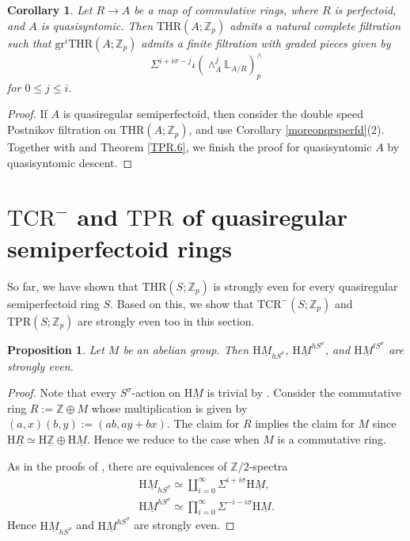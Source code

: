 \documentclass[10pt]{amsart}
\newtheorem{prop}[thm]{Proposition}
\newtheorem{cor}[thm]{Corollary}
\theoremstyle{definition}
\numberwithin{equation}{section}
\renewcommand{\L}{\mathbb{L}}
\newcommand{\Z}{\mathbb{Z}}
\newcommand{\rH}{\mathrm{H}}
\newcommand{\ul}{\underline}
\newcommand{\gr}{\mathrm{gr}}
\newcommand{\TPR}{\mathrm{TPR}}
\newcommand{\THR}{\mathrm{THR}}
\newcommand{\TCR}{\mathrm{TCR}}
\begin{document}
{\begin{cor}
Let $R\to A$ be a map of commutative rings,
where $R$ is perfectoid,
and $A$ is quasisyntomic.
Then $\THR(A;\Z_p)$ admits a natural complete filtration such that $\gr^i\THR(A;\Z_p)$ admits a finite filtration with graded pieces given by \[
\Sigma^{i+i\sigma-j}\iota(\wedge_A^j \L_{A/R})^{\wedge}_p
\]
for $0 \leq j \leq i$.
\end{cor}    
\begin{proof}
If $A$ is quasiregular semiperfectoid,
then consider the double speed Postnikov filtration on $\THR(A;\Z_p)$,
and use Corollary \ref{moreonqrsperfd}(2).
Together with \cite[Remark 4.9, Proposition 4.31, Variant 4.33]{BMS19} and Theorem \ref{TPR.6},
we finish the proof for quasisyntomic $A$ by quasisyntomic descent.
\end{proof}





\section{\texorpdfstring{$\TCR^-$}{TCR-} and \texorpdfstring{$\TPR$}{TPR} of quasiregular semiperfectoid rings}

So far,
we have shown that $\THR(S;\Z_p)$ is strongly even for every quasiregular semiperfectoid ring $S$.
Based on this,
we show that $\TCR^-(S;\Z_p)$ and $\TPR(S;\Z_p)$ are strongly even too in this section.
















\begin{prop}
\label{TPR.5}
Let $M$ be an abelian group.
Then $\rH \ul{M}_{hS^\sigma}$, $\rH \ul{M}^{hS^\sigma}$, and $\rH \ul{M}^{tS^\sigma}$ are strongly even.
\end{prop}
\begin{proof}
Note that every $S^\sigma$-action on $\rH \ul{M}$ is trivial by \cite[Proposition 6.10]{QS22}.
Consider the commutative ring $R:=\Z\oplus M$ whose multiplication is given by $(a,x)(b,y):=(ab,ay+bx)$.
The claim for $R$ implies the claim for $M$ since $\rH \ul{R}\simeq \rH \ul{\Z}\oplus \rH\ul{M}$.
Hence we reduce to the case when $M$ is a commutative ring.

As in the proofs of \cite[Lemma 4.7, Proposition 6.14]{QS22},
there are equivalences of $\Z/2$-spectra
\begin{gather*}
\rH \ul{M}_{hS^\sigma}
\simeq
\coprod_{i=0}^\infty \Sigma^{i+i\sigma} \rH \ul{M},
\\
\rH \ul{M}^{hS^\sigma}
\simeq
\prod_{i=0}^\infty \Sigma^{-i-i\sigma} \rH \ul{M}.
\end{gather*}
Hence $\rH \ul{M}_{hS^\sigma}$ and $\rH \ul{M}^{hS^\sigma}$ are strongly even.



\end{proof}}
\end{document}
